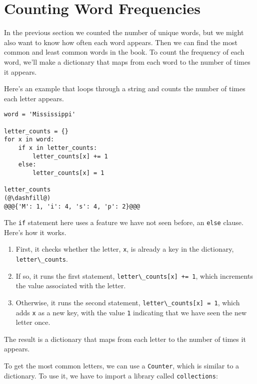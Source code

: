 \hypertarget{counting-word-frequencies}{%
\section{Counting Word Frequencies}\label{counting-word-frequencies}}

In the previous section we counted the number of unique words, but we
might also want to know how often each word appears. Then we can find
the most common and least common words in the book. To count the
frequency of each word, we'll make a dictionary that maps from each word
to the number of times it appears.

Here's an example that loops through a string and counts the number of
times each letter appears.

\begin{lstlisting}[]
word = 'Mississippi'

letter_counts = {}
for x in word:
    if x in letter_counts:
        letter_counts[x] += 1
    else:
        letter_counts[x] = 1
        
letter_counts
(@\dashfill@)
@@@{'M': 1, 'i': 4, 's': 4, 'p': 2}@@@
\end{lstlisting}

The \passthrough{\lstinline!if!} statement here uses a feature we have
not seen before, an \passthrough{\lstinline!else!} clause. Here's how it
works.

\begin{enumerate}
\def\labelenumi{\arabic{enumi}.}
\item
  First, it checks whether the letter, \passthrough{\lstinline!x!}, is
  already a key in the dictionary,
  \passthrough{\lstinline!letter\_counts!}.
\item
  If so, it runs the first statement,
  \passthrough{\lstinline!letter\_counts[x] += 1!}, which increments the
  value associated with the letter.
\item
  Otherwise, it runs the second statement,
  \passthrough{\lstinline!letter\_counts[x] = 1!}, which adds
  \passthrough{\lstinline!x!} as a new key, with the value
  \passthrough{\lstinline!1!} indicating that we have seen the new
  letter once.
\end{enumerate}

The result is a dictionary that maps from each letter to the number of
times it appears.

To get the most common letters, we can use a
\passthrough{\lstinline!Counter!}, which is similar to a dictionary. To
use it, we have to import a library called
\passthrough{\lstinline!collections!}:

